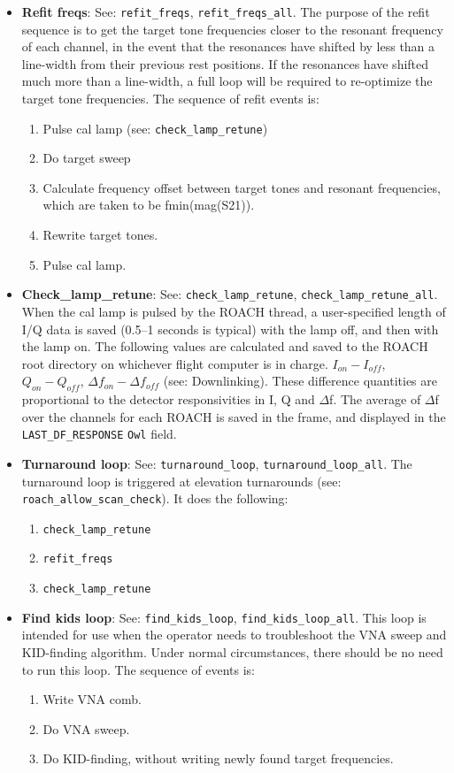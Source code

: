 \begin{itemize}[leftmargin=*,label={}]
\item \textbf{Refit freqs}: See: \texttt{refit\_freqs}, \texttt{refit\_freqs\_all}. The purpose of the refit sequence is to get the target tone frequencies closer to the resonant frequency of each channel, in the event that the resonances have shifted by less than a line-width from their previous rest positions. If the resonances have shifted much more than a line-width, a full loop will be required to re-optimize the target tone frequencies. The sequence of refit events is:
\begin{enumerate}
  \item Pulse cal lamp (see: \texttt{check\_lamp\_retune})
  \item Do target sweep
  \item Calculate frequency offset between target tones and resonant frequencies, which are taken to be f\textbar min(mag(S21)).
  \item Rewrite target tones.
  \item Pulse cal lamp.
\end{enumerate}

\item \textbf{Check\_lamp\_retune}: See: \texttt{check\_lamp\_retune}, \texttt{check\_lamp\_retune\_all}. When the cal lamp is pulsed by the ROACH thread, a user-specified length of I/Q data is saved (0.5--1 seconds is typical) with the lamp off, and then with the lamp on. The following values are calculated and saved to the ROACH root directory on whichever flight computer is in charge. $I_{on} - I_{off}$,  $Q_{on} - Q_{off}$, $\Delta f_{on} - \Delta f_{off}$ (see: Downlinking). These difference quantities are proportional to the detector responsivities in I, Q and $\Delta$f. The average of $\Delta$f over the channels for each ROACH is saved in the frame, and displayed in the \texttt{LAST\_DF\_RESPONSE} \texttt{Owl} field.

\item \textbf{Turnaround loop}: See: \texttt{turnaround\_loop}, \texttt{turnaround\_loop\_all}. The turnaround loop is triggered at elevation turnarounds (see: \texttt{roach\_allow\_scan\_check}). It does the following:
\begin{enumerate}
  \item \texttt{check\_lamp\_retune}
  \item \texttt{refit\_freqs}
  \item \texttt{check\_lamp\_retune}
\end{enumerate}

\item \textbf{Find kids loop}: See: \texttt{find\_kids\_loop}, \texttt{find\_kids\_loop\_all}. This loop is intended for use when the operator needs to troubleshoot the VNA sweep and KID-finding algorithm. Under normal circumstances, there should be no need to run this loop. The sequence of events is:
\begin{enumerate}
  \item Write VNA comb.
  \item Do VNA sweep.
  \item Do KID-finding, without writing newly found target frequencies.
\end{enumerate}


\end{itemize}
